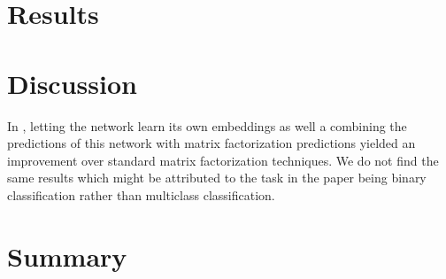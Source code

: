 \documentclass[10pt,conference,compsocconf]{IEEEtran}
\begin{document}
\section{Results}
\label{sec:results}


\section{Discussion}

In \cite{he2017neural}, letting the network learn its own embeddings as well a combining the predictions of this network with matrix factorization predictions yielded an improvement over standard matrix factorization techniques. We do not find the same results which might be attributed to the task in the paper being binary classification rather than multiclass classification.


\label{sec:discussion}

\section{Summary}




\end{document}
